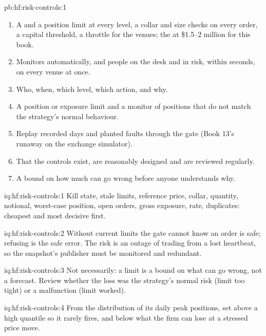 \begin{solution}{pb:hf:risk-controls:1}
\begin{enumerate}
position limit and \$2.1 million with a , which stops it first, after 12 seconds.
\item A  and a position limit at every level, a collar and size checks on every order, a capital threshold, a throttle for the venues; the
 at \$1.5--2 million for this book.
\item Monitors automatically, and people on the desk and in risk, within seconds, on every venue at once.
\item Who, when, which level, which action, and why.
\item A position or exposure limit and a monitor of positions that do not match the strategy's normal behaviour.
\item Replay recorded days and planted faults through the gate (Book 13's runaway on the exchange simulator).
\item That the controls exist, are reasonably designed and are reviewed regularly.
\item A bound on how much can go wrong before anyone understands why.
\end{enumerate}
\end{solution}

\begin{solution}{iq:hf:risk-controls:1}
Kill state, stale limits, reference price, collar, quantity, notional, worst-case position, open orders, gross exposure, rate, duplicates: cheapest and
most decisive first.
\end{solution}

\begin{solution}{iq:hf:risk-controls:2}
Without current limits the gate cannot know an order is safe; refusing is the safe error. The risk is an outage of trading from a lost heartbeat,
so the snapshot's publisher must be monitored and redundant.
\end{solution}

\begin{solution}{iq:hf:risk-controls:3}
Not necessarily: a limit is a bound on what can go wrong, not a forecast. Review whether the loss was the strategy's normal risk (limit too tight) or
a malfunction (limit worked).
\end{solution}

\begin{solution}{iq:hf:risk-controls:4}
From the distribution of its daily peak positions, set above a high quantile so it rarely fires, and below what the firm can lose at a stressed
price move.
\end{solution}

